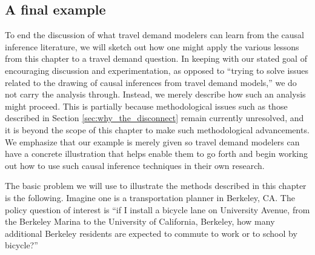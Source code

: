\subsection{A final example}
\label{sec:final_example}
To end the discussion of what travel demand modelers can learn from the causal inference literature, we will sketch out how one might apply the various lessons from this chapter to a travel demand question. In keeping with our stated goal of encouraging discussion and experimentation, as opposed to ``trying to solve issues related to the drawing of causal inferences from travel demand models,'' we do not carry the analysis through. Instead, we merely describe how such an analysis might proceed. This is partially because methodological issues such as those described in Section \ref{sec:why_the_disconnect} remain currently unresolved, and it is beyond the scope of this chapter to make such methodological advancements. We emphasize that our example is merely given so travel demand modelers can have a concrete illustration that helps enable them to go forth and begin working out how to use such causal inference techniques in their own research.

The basic problem we will use to illustrate the methods described in this chapter is the following. Imagine one is a transportation planner in Berkeley, CA. The policy question of interest is ``if I install a bicycle lane on University Avenue, from the Berkeley Marina to the University of California, Berkeley, how many additional Berkeley residents are expected to commute to work or to school by bicycle?''

